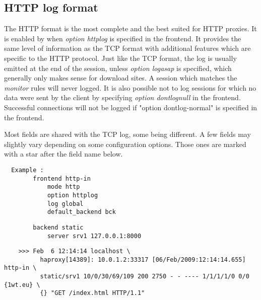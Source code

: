 
\subsection{HTTP log format}

The HTTP format is the most complete and the best suited for HTTP proxies. It
is enabled by when \emph{option httplog} is specified in the frontend. It provides
the same level of information as the TCP format with additional features which
are specific to the HTTP protocol. Just like the TCP format, the log is usually
emitted at the end of the session, unless \emph{option logasap} is specified, which
generally only makes sense for download sites. A session which matches the
\emph{monitor} rules will never logged. It is also possible not to log sessions for
which no data were sent by the client by specifying \emph{option dontlognull} in the
frontend. Successful connections will not be logged if "option dontlog-normal"
is specified in the frontend.


Most fields are shared with the TCP log, some being different. A few fields may
slightly vary depending on some configuration options. Those ones are marked
with a star \CHAR{*} after the field name below.

\begin{verbatim}
  Example :
        frontend http-in
            mode http
            option httplog
            log global
            default_backend bck
\end{verbatim}

\begin{verbatim}
        backend static
            server srv1 127.0.0.1:8000
\end{verbatim}

\begin{verbatim}
    >>> Feb  6 12:14:14 localhost \
          haproxy[14389]: 10.0.1.2:33317 [06/Feb/2009:12:14:14.655] http-in \
          static/srv1 10/0/30/69/109 200 2750 - - ---- 1/1/1/1/0 0/0 {1wt.eu} \
          {} "GET /index.html HTTP/1.1"
\end{verbatim}

